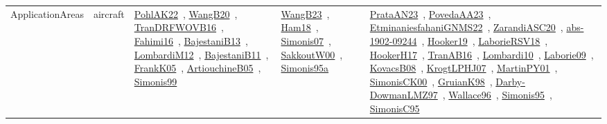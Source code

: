 {\begin{longtable}{lp{3cm}>{\raggedright\arraybackslash}p{6cm}>{\raggedright\arraybackslash}p{6cm}>{\raggedright\arraybackslash}p{8cm}}
ApplicationAreas & aircraft & \href{works/PohlAK22.pdf}{PohlAK22}~\cite{PohlAK22}, \href{works/WangB20.pdf}{WangB20}~\cite{WangB20}, \href{works/TranDRFWOVB16.pdf}{TranDRFWOVB16}~\cite{TranDRFWOVB16}, \href{works/Fahimi16.pdf}{Fahimi16}~\cite{Fahimi16}, \href{works/BajestaniB13.pdf}{BajestaniB13}~\cite{BajestaniB13}, \href{works/LombardiM12.pdf}{LombardiM12}~\cite{LombardiM12}, \href{works/BajestaniB11.pdf}{BajestaniB11}~\cite{BajestaniB11}, \href{works/FrankK05.pdf}{FrankK05}~\cite{FrankK05}, \href{works/ArtiouchineB05.pdf}{ArtiouchineB05}~\cite{ArtiouchineB05}, \href{works/Simonis99.pdf}{Simonis99}~\cite{Simonis99} & \href{works/WangB23.pdf}{WangB23}~\cite{WangB23}, \href{works/Ham18.pdf}{Ham18}~\cite{Ham18}, \href{works/Simonis07.pdf}{Simonis07}~\cite{Simonis07}, \href{works/SakkoutW00.pdf}{SakkoutW00}~\cite{SakkoutW00}, \href{works/Simonis95a.pdf}{Simonis95a}~\cite{Simonis95a} & \href{works/PrataAN23.pdf}{PrataAN23}~\cite{PrataAN23}, \href{works/PovedaAA23.pdf}{PovedaAA23}~\cite{PovedaAA23}, \href{works/EtminaniesfahaniGNMS22.pdf}{EtminaniesfahaniGNMS22}~\cite{EtminaniesfahaniGNMS22}, \href{works/ZarandiASC20.pdf}{ZarandiASC20}~\cite{ZarandiASC20}, \href{works/abs-1902-09244.pdf}{abs-1902-09244}~\cite{abs-1902-09244}, \href{works/Hooker19.pdf}{Hooker19}~\cite{Hooker19}, \href{works/LaborieRSV18.pdf}{LaborieRSV18}~\cite{LaborieRSV18}, \href{works/HookerH17.pdf}{HookerH17}~\cite{HookerH17}, \href{works/TranAB16.pdf}{TranAB16}~\cite{TranAB16}, \href{works/Lombardi10.pdf}{Lombardi10}~\cite{Lombardi10}, \href{works/Laborie09.pdf}{Laborie09}~\cite{Laborie09}, \href{works/KovacsB08.pdf}{KovacsB08}~\cite{KovacsB08}, \href{works/KrogtLPHJ07.pdf}{KrogtLPHJ07}~\cite{KrogtLPHJ07}, \href{works/MartinPY01.pdf}{MartinPY01}~\cite{MartinPY01}, \href{works/SimonisCK00.pdf}{SimonisCK00}~\cite{SimonisCK00}, \href{works/GruianK98.pdf}{GruianK98}~\cite{GruianK98}, \href{works/Darby-DowmanLMZ97.pdf}{Darby-DowmanLMZ97}~\cite{Darby-DowmanLMZ97}, \href{works/Wallace96.pdf}{Wallace96}~\cite{Wallace96}, \href{works/Simonis95.pdf}{Simonis95}~\cite{Simonis95}, \href{works/SimonisC95.pdf}{SimonisC95}~\cite{SimonisC95}\\

\end{longtable}}

